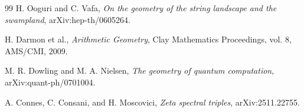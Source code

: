 \documentclass[11pt]{article}
\theoremstyle{remark}
\begin{document}
\begin{thebibliography}{99}
H. Ooguri and C. Vafa, \textit{On the geometry of the string landscape and the swampland}, arXiv:hep-th/0605264.

H. Darmon et al., \textit{Arithmetic Geometry}, Clay Mathematics Proceedings, vol. 8, AMS/CMI, 2009.

M. R. Dowling and M. A. Nielsen, \textit{The geometry of quantum computation}, arXiv:quant-ph/0701004.

A. Connes, C. Consani, and H. Moscovici, \textit{Zeta spectral triples}, arXiv:2511.22755.

\end{thebibliography}
\end{document}
